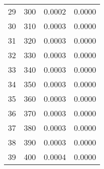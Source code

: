 \begin{table}[H]
\begin{tabular}{cccc}
\cline{1-4}
29 & 300 & 0.0002 & 0.0000 \\
\cline{1-4}
30 & 310 & 0.0003 & 0.0000 \\
\cline{1-4}
31 & 320 & 0.0003 & 0.0000 \\
\cline{1-4}
32 & 330 & 0.0003 & 0.0000 \\
\cline{1-4}
33 & 340 & 0.0003 & 0.0000 \\
\cline{1-4}
34 & 350 & 0.0003 & 0.0000 \\
\cline{1-4}
35 & 360 & 0.0003 & 0.0000 \\
\cline{1-4}
36 & 370 & 0.0003 & 0.0000 \\
\cline{1-4}
37 & 380 & 0.0003 & 0.0000 \\
\cline{1-4}
38 & 390 & 0.0003 & 0.0000 \\
\cline{1-4}
39 & 400 & 0.0004 & 0.0000 \\
\cline{1-4}
\end{tabular}
\end{table}
